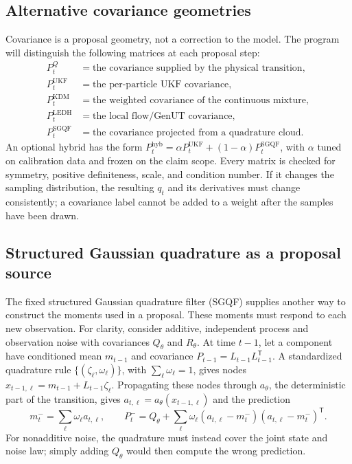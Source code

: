 \documentclass[11pt]{article}
\begin{document}
\subsection{Alternative covariance geometries}

Covariance is a proposal geometry, not a correction to the model. The program
will distinguish the following matrices at each proposal step:
\begin{align}
 P_t^{Q}&=\text{the covariance supplied by the physical transition},\\
 P_t^{\mathrm{UKF}}&=\text{the per-particle UKF covariance},\\
 P_t^{\mathrm{KDM}}&=\text{the weighted covariance of the continuous mixture},\\
 P_t^{\mathrm{LEDH}}&=\text{the local flow/GenUT covariance},\\
 P_t^{\mathrm{SGQF}}&=\text{the covariance projected from a quadrature cloud}.
\end{align}
An optional hybrid has the form
$P_t^{\mathrm{hyb}}=\alpha P_t^{\mathrm{UKF}}+(1-\alpha)P_t^{\mathrm{SGQF}}$,
with $\alpha$ tuned on calibration data and frozen on the claim scope. Every
matrix is checked for symmetry, positive definiteness, scale, and condition
number. If it changes the sampling distribution, the resulting $q_t$ and its
derivatives must change consistently; a covariance label cannot be added to a
weight after the samples have been drawn.

\subsection{Structured Gaussian quadrature as a proposal source}

The fixed structured Gaussian quadrature filter (SGQF) supplies another way to
construct the moments used in a proposal. These moments must respond to each
new observation. For clarity, consider additive, independent process and
observation noise with covariances $Q_\theta$ and $R_\theta$. At time $t-1$,
let a component have conditioned mean $m_{t-1}$ and covariance
$P_{t-1}=L_{t-1}L_{t-1}^{\mathsf T}$. A standardized quadrature rule
$\{(\zeta_\ell,\omega_\ell)\}$, with $\sum_\ell\omega_\ell=1$, gives nodes
$x_{t-1,\ell}=m_{t-1}+L_{t-1}\zeta_\ell$. Propagating these nodes through
$a_\theta$, the deterministic part of the transition, gives
$a_{t,\ell}=a_\theta(x_{t-1,\ell})$ and the prediction
\begin{equation}
 m_t^-=\sum_\ell \omega_\ell a_{t,\ell},\qquad
 P_t^-=Q_\theta+\sum_\ell\omega_\ell
       (a_{t,\ell}-m_t^-)(a_{t,\ell}-m_t^-)^\mathsf T.
                                                        \label{eq:sgqf-moments}
\end{equation}
For nonadditive noise, the quadrature must instead cover the joint state and
noise law; simply adding $Q_\theta$ would then compute the wrong prediction.
\end{document}
